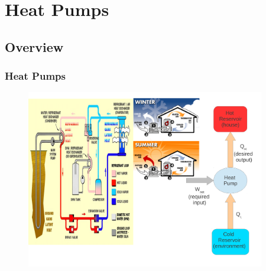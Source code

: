 \documentclass[10pt,compress,handout,ignorenonframetext]{beamer}
\begin{document}
\section{Heat Pumps}

\subsection{Overview}
\begin{frame}
 \frametitle{Heat Pumps}
    \begin{figure}%
     \begin{center}
      \includegraphics[width=12.cm,height=7.8cm]{./Pics/Overview_Refrig35}
     \end{center}
    \end{figure}
\end{frame}
\end{document}
